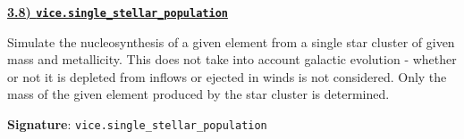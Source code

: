 \documentclass{report}
\begin{document}
\newpage 
\noindent 
\begin{center} 
\hypertarget{func:single_stellar_population}{
	\underline{\LARGE
		\textbf{3.8) \texttt{vice.single\_stellar\_population}}
	}
}
\end{center}
\par\null\par\noindent 
Simulate the nucleosynthesis of a given element from a single star cluster of 
given mass and metallicity. This does not take into account galactic evolution 
- whether or not it is depleted from inflows or ejected in winds is not 
considered. Only the mass of the given element produced by the star cluster 
is determined. 
\par\null\par\noindent 
\textbf{Signature}: \texttt{vice.single\_stellar\_population} 
\par\noindent 
\end{document}
